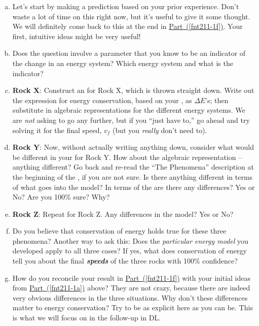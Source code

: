 \begin{enumerate}[(a)]

	\item Let's start by making a prediction based on your prior experience. Don't waste a lot of time on this right now, but it's useful to give it some thought. We will definitely come back to this at the end in \hyperref[fnt211-1f]{Part~(\ref*{fnt211-1f})}. Your first, intuitive ideas might be very useful!
	\label{fnt211-1a}
	
	\item Does the question involve a parameter that you know to be an indicator of the change in an energy system? Which energy system and what is the indicator?
	\label{fnt211-1b}
	
	\item \textbf{Rock X}: Construct an \EnergyDiagram{} for Rock X, which is thrown straight down. Write out the expression for energy conservation, based on your \EnergyDiagram{}, as $\Delta E$'s; then substitute in algebraic representations for the different energy systems. We are \emph{not} asking to go any further, but if you ``just have to,'' go ahead and try solving it for the final speed, $v_f$ (but you \emph{really} don't need to).
	\label{fnt211-1c}
	
	\item \textbf{Rock Y}: Now, without actually writing anything down, consider what would be different in your \EnergyDiagram{} for Rock Y. How about the algebraic representation -- anything different?  Go back and re-read the ``The Phenomena'' description at the beginning of the \FNT{}, if you are not sure. Is there anything different in terms of what goes into the model? In terms of the \EnergyInteractionModel{} are there any differences?  Yes or No? Are you 100\% sure? Why?
	\label{fnt211-1d}
	
	\item \textbf{Rock Z}: Repeat for Rock Z. Any differences in the model?  Yes or No?
	\label{fnt211-1e}
	
	\item Do you believe that conservation of energy holds true for these three phenomena? Another way to ask this: Does the {\em particular energy model} you developed apply to all three cases?  If yes, what does conservation of energy tell you about the final \textbf{\em speeds} of the three rocks with 100\% confidence?
	\label{fnt211-1f}
	
	\item How do you reconcile your result in \hyperref[fnt211-1f]{Part~(\ref*{fnt211-1f})} with your initial ideas from \hyperref[fnt211-1a]{Part~(\ref*{fnt211-1a})} above?  They are not crazy, because there are indeed very obvious differences in the three situations. Why don't these differences matter to energy conservation?  Try to be as explicit here as you can be. This is what we will focus on in the \FNT{} follow-up in DL.
	\label{fnt211-1g}
\end{enumerate}